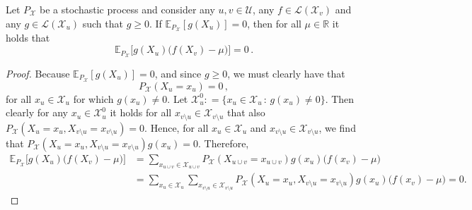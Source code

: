 \documentclass[twoside,11pt]{article}
\newcommand{\reals}{\mathbb{R}}
\newcommand{\states}{\mathcal{X}}
\newcommand{\gambles}{\mathcal{L}}
\newcommand{\coloneqq}{:\!=}
\begin{document}
\begin{lemma}\label{lemma:conditioning_zero_means_bayes_zero}
Let $P_\states$ be a stochastic process and consider any $u,v\in\mathcal{U}$, any $f\in\gambles(\states_v)$ and any $g\in\gambles(\states_u)$ such that $g\geq 0$. If\/ $\mathbb{E}_{P_\states}[g(X_u)]=0$, then for all $\mu\in\reals$ it holds that
\begin{equation*}
\mathbb{E}_{P_\states}\bigl[g(X_u)\bigl(f(X_v) - \mu\bigr)\bigr]=0\,.
\end{equation*}
\end{lemma}
\begin{proof}
Because $\mathbb{E}_{P_\states}[g(X_u)]=0$, and since $g\geq 0$, we must clearly have that
\begin{equation*}
P_\states(X_u=x_u) = 0\,,
\end{equation*}
for all $x_u\in\states_u$ for which $g(x_u)\neq 0$. Let $\states_u^0\coloneqq\{x_u\in\states_u\,:\,g(x_u)\neq 0\}$. Then clearly for any $x_u\in\states_u^0$ it holds for all $x_{v\setminus u}\in\states_{v\setminus u}$ that also $P_\states(X_u=x_u,X_{v\setminus u}=x_{v\setminus u})=0$. Hence, for all $x_u\in\states_u$ and $x_{v\setminus u}\in\states_{v\setminus u}$, we find that $P_\states(X_u=x_u,X_{v\setminus u}=x_{v\setminus u})g(x_u)=0$. Therefore,
\begin{align*}
\mathbb{E}_{P_\states}\bigl[g(X_u)\bigl(f(X_v) - \mu\bigr)\bigr] &= \sum_{x_{u\cup v}\in\states_{u\cup v}} P_\states(X_{u\cup v}=x_{u\cup v})g(x_u)\bigl(f(x_v) - \mu\bigr) \\
 &= \sum_{x_{u}\in\states_{u}}\sum_{x_{v\setminus u}\in\states_{v\setminus u}} P_\states(X_u=x_u,X_{v\setminus u}=x_{v\setminus u})g(x_u)\bigl(f(x_v) - \mu\bigr)=0. 
\end{align*}
\end{proof}
\end{document}
